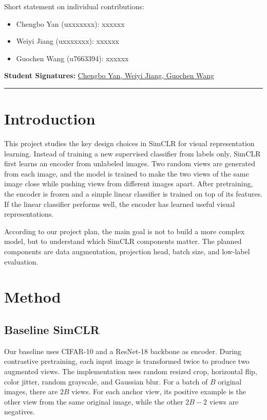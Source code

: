 \documentclass[10pt]{article}
\begin{document}
Short statement on individual contributions: 
\begin{itemize}[leftmargin=2.2em]
    \item Chengbo Yan (uxxxxxxx): xxxxxx
    \item Weiyi Jiang (uxxxxxxx): xxxxxx
    \item Guochen Wang (u7663394): xxxxxx
\end{itemize}

\vspace{1em}

\textbf{Student Signatures:}
\underline{\hspace{0.5em}Chengbo Yan, Weiyi Jiang, Guochen Wang\hspace{0.5em}}

\vspace{3em}
\hrule

\newpage

\section{Introduction}

This project studies the key design choices in SimCLR for visual representation learning. Instead of training a new supervised classifier from labels only, SimCLR first learns an encoder from unlabeled images. Two random views are generated from each image, and the model is trained to make the two views of the same image close while pushing views from different images apart. After pretraining, the encoder is frozen and a simple linear classifier is trained on top of its features. If the linear classifier performs well, the encoder has learned useful
visual representations.

According to our project plan, the main goal is not to build a more complex model, but to understand which SimCLR components matter. The planned components are data augmentation, projection head, batch size, and low-label evaluation.

\section{Method}

\subsection{Baseline SimCLR}

Our baseline uses CIFAR-10 and a ResNet-18 backbone as encoder. During contrastive pretraining, each input image is transformed twice to produce two augmented views. The implementation uses random resized crop, horizontal flip, color jitter, random grayscale, and Gaussian blur. For a batch of $B$ original images, there are $2B$ views. For each anchor view, its positive example is the other view from the same original image, while the other $2B-2$ views are negatives.
\end{document}
